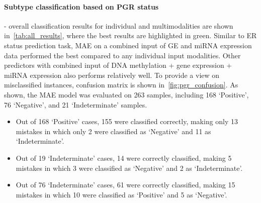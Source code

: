 \paragraph{Subtype classification based on PGR status} - overall classification results for individual and multimodalities are shown in~\cref{tab:all_results}, where the best results are highlighted in green. Similar to ER status prediction task, MAE on a combined input of GE and miRNA expression data performed the best compared to any individual input modalities. Other predictors with combined input of DNA methylation + gene expression + miRNA expression also performs relatively well. To provide a view on misclassified instances, confusion matrix is shown in~\cref{fig:pgr_confusion}. As shown, the MAE model was evaluated on 263 samples, including 168 `Positive', 76 `Negative', and 21 `Indeterminate' samples. 

\begin{itemize}[noitemsep]
    \item Out of 168 `Positive' cases, 155 were classified correctly, making only 13 mistakes in which only 2 were classified as `Negative' and 11 as `Indeterminate'. 

    \item Out of 19 `Indeterminate' cases, 14 were correctly classified, making 5 mistakes in which 3 were classified as `Negative' and 2 as `Indeterminate'. 

    \item Out of 76 `Indeterminate' cases, 61 were correctly classified, making 15 mistakes in which 10 were classified as `Positive' and 5 as `Negative'.  
\end{itemize}

